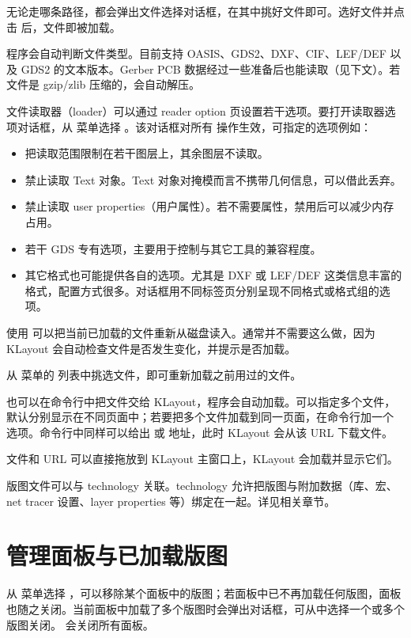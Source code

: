 无论走哪条路径，都会弹出文件选择对话框，在其中挑好文件即可。选好文件并点击  后，文件即被加载。

程序会自动判断文件类型。目前支持 OASIS、GDS2、DXF、CIF、LEF/DEF 以及 GDS2 的文本版本。Gerber PCB 数据经过一些准备后也能读取（见下文）。若文件是 gzip/zlib 压缩的，会自动解压。

文件读取器（loader）可以通过 reader option 页设置若干选项。要打开读取器选项对话框，从  菜单选择 。该对话框对所有  操作生效，可指定的选项例如：

\begin{itemize}
\item 把读取范围限制在若干图层上，其余图层不读取。
\item 禁止读取 Text 对象。Text 对象对掩模而言不携带几何信息，可以借此丢弃。
\item 禁止读取 user properties（用户属性）。若不需要属性，禁用后可以减少内存占用。
\item 若干 GDS 专有选项，主要用于控制与其它工具的兼容程度。
\item 其它格式也可能提供各自的选项。尤其是 DXF 或 LEF/DEF 这类信息丰富的格式，配置方式很多。对话框用不同标签页分别呈现不同格式或格式组的选项。
\end{itemize}

使用  可以把当前已加载的文件重新从磁盘读入。通常并不需要这么做，因为 KLayout 会自动检查文件是否发生变化，并提示是否加载。

从  菜单的  列表中挑选文件，即可重新加载之前用过的文件。

也可以在命令行中把文件交给 KLayout，程序会自动加载。可以指定多个文件，默认分别显示在不同页面中；若要把多个文件加载到同一页面，在命令行加一个  选项。命令行中同样可以给出  或  地址，此时 KLayout 会从该 URL 下载文件。

文件和 URL 可以直接拖放到 KLayout 主窗口上，KLayout 会加载并显示它们。

版图文件可以与 technology 关联。technology 允许把版图与附加数据（库、宏、net tracer 设置、layer properties 等）绑定在一起。详见相关章节。

\section{管理面板与已加载版图}\label{sec:panels}

从  菜单选择 ，可以移除某个面板中的版图；若面板中已不再加载任何版图，面板也随之关闭。当前面板中加载了多个版图时会弹出对话框，可从中选择一个或多个版图关闭。 会关闭所有面板。

